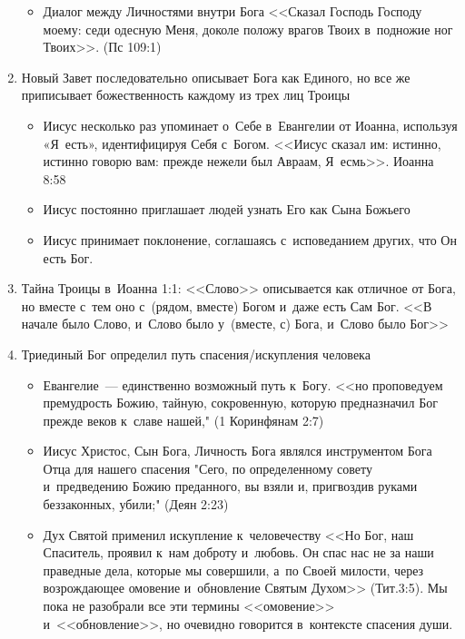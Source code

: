 \documentclass[a4paper,12pt]{article}
\begin{document}
\begin{enumerate}
\begin{itemize}
        \item Диалог между Личностями внутри Бога <<Сказал Господь Господу моему: седи одесную Меня, доколе положу врагов Твоих в~подножие ног Твоих>>. (Пс 109:1)
        \end{itemize}
    \item Новый Завет последовательно описывает Бога как Единого, но все же приписывает божественность каждому из трех лиц Троицы
        \begin{itemize}
        \item Иисус несколько раз упоминает о~Себе в~Евангелии от Иоанна, используя «Я~есть», идентифицируя Себя с~Богом. <<Иисус сказал им: истинно, истинно говорю вам: прежде нежели был Авраам, Я~есмь>>. Иоанна 8:58
        \item Иисус постоянно приглашает людей узнать Его как Сына Божьего
        \item Иисус принимает поклонение, соглашаясь с~исповеданием других, что Он есть Бог.
        \end{itemize}
    \item Тайна Троицы в~Иоанна 1:1: <<Слово>> описывается как отличное от Бога, но вместе с~тем оно с~(рядом, вместе) Богом и~даже есть Сам Бог. <<В начале было Слово, и~Слово было у~(вместе, с) Бога, и~Слово было Бог>> 
    \item Триединый Бог определил путь спасения/искупления человека
        \begin{itemize}
        \item Евангелие~--- единственно возможный путь к~Богу. <<но проповедуем премудрость Божию, тайную, сокровенную, которую предназначил Бог прежде веков к~славе нашей," (1 Коринфянам 2:7)
        \item Иисус Христос, Сын Бога, Личность Бога являлся инструментом Бога Отца для нашего спасения "Сего, по определенному совету и~предведению Божию преданного, вы взяли и, пригвоздив руками беззаконных, убили;" (Деян 2:23)
        \item Дух Святой применил искупление к~человечеству <<Но Бог, наш Спаситель, проявил к~нам доброту и~любовь. Он спас нас не за наши праведные дела, которые мы совершили, а~по Своей милости, через возрождающее омовение и~обновление Святым Духом>> (Тит.3:5). Мы пока не разобрали все эти термины <<омовение>> и~<<обновление>>, но очевидно говорится в~контексте спасения души.
        \end{itemize}
\end{enumerate}
\end{document}
